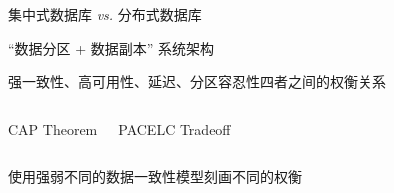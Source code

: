 
\begin{frame}{}
	\begin{center}
		集中式数据库 \emph{vs.} 分布式数据库


	\end{center}
\end{frame}

\begin{frame}{}
	\begin{center}
		``数据分区 + 数据副本'' 系统架构
	\end{center}
\end{frame}

\begin{frame}{}
	\begin{center}
		强一致性、高可用性、延迟、分区容忍性四者之间的权衡关系
	\end{center}
	\begin{columns}[c]
		\begin{center}
			{CAP Theorem}%
		\end{center}
		\begin{center}

			\vspace{0.50cm}
			{PACELC Tradeoff\\ }
		\end{center}
	\end{columns}

	\vspace{0.50cm}
	\begin{center}
		使用强弱不同的数据一致性模型刻画不同的权衡
	\end{center}
\end{frame}

\begin{frame}{}
	\begin{columns}[c]
	\end{columns}
\end{frame}

